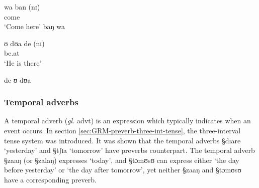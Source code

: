 \begin{exe}
\ex\label{ex:vp}
\begin{xlist}

\ex\label{ex:deic-adv-prox}
\gll wa ban (nɪ)\\
     come {\advl} {\postp} \\
\glt  `Come here'
\ex\label{ex:deic-adv-prox-out}
\textasteriskcentered baŋ wa 

 \ex\label{ex:deic-adv-dist}
\gll ʊ  dʊa de (nɪ) \\
       {\psg}  be.at  {\advl}  {\postp}\\
\glt  `He is there'

\ex\label{ex:deic-adv-dist-out}
\textasteriskcentered de ʊ  dʊa 
\end{xlist}
\end{exe}



\subsubsection{Temporal adverbs}
\label{sec:GRM-manner-adv}

A temporal adverb  ({\it gl.} {\sc advt}) is an expression which typically 
indicates when  an event occurs. In section
\ref{sec:GRM-preverb-three-int-tense}, the three-interval tense system was
introduced. It was shown that the temporal adverbs {\S  dɪare} `yesterday' and
{\S tʃɪa} `tomorrow'  have preverbs counterpart. The  temporal
adverb  {\S zaaŋ} (or {\S zalaŋ}) expresses `today',  and   {\S tɔmʊsʊ} can
express either  `the day before yesterday' or  `the day after tomorrow',   yet 
neither {\S zaaŋ} and {\S tɔmʊsʊ}   have a corresponding preverb. 


